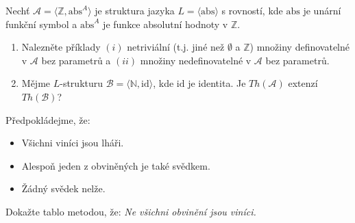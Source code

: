 \documentclass[a4paper,12pt]{article}
\begin{document}
\medskip\begin{problem} %
Nechť $\mathcal{A}=\langle\mathbb{Z},\mathrm{abs}^A \rangle$ je struktura jazyka $L=\langle \mathrm{abs} \rangle$ s rovností, kde $\mathrm{abs}$ je unární funkční symbol a $\mathrm{abs}^A$ je funkce absolutní hodnoty v $\mathbb{Z}$.
\begin{enumerate}
    \item Nalezněte příklady $(i)$ netriviální (t.j. jiné než $\emptyset$ a $\mathbb{Z}$) množiny definovatelné v $\mathcal{A}$ bez parametrů a $(ii)$ množiny nedefinovatelné v $\mathcal{A}$ bez parametrů.
    \item Mějme $L$-strukturu $\mathcal{B}=\langle\mathbb{N},\mathrm{id} \rangle$, kde $\mathrm{id}$ je identita. Je $Th(\mathcal{A})$ extenzí $Th(\mathcal{B})$?
\end{enumerate}
\end{problem}


\medskip\begin{problem}
    Předpokládejme, že:
    \begin{itemize}\it
    \item Všichni viníci jsou lháři.
    \item Alespoň jeden z obviněných je také svědkem.
    \item Žádný svědek nelže.
    \end{itemize}
    Dokažte tablo metodou, že: {\it Ne všichni obvinění jsou viníci.}
\end{problem} 
    
\end{document}
